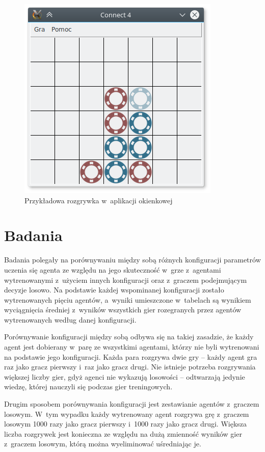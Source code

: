 \documentclass[a4paper, 12pt, oneside]{report}
\begin{document}
\begin{figure}[ht]
\centering
\includegraphics[scale=0.8]{connect4_gui.png}
\caption{Przykładowa rozgrywka w~aplikacji okienkowej}
\label{fig:gui}
\end{figure}

\chapter{Badania}
\label{chap:badania}

Badania polegały na porównywaniu między sobą różnych konfiguracji parametrów uczenia się agenta ze względu na jego skuteczność w~grze z~agentami wytrenowanymi z~użyciem innych konfiguracji oraz z~graczem podejmującym decyzje losowo. Na podstawie każdej wspominanej konfiguracji zostało wytrenowanych pięciu agentów, a~wyniki umieszczone w~tabelach są wynikiem wyciągnięcia średniej z~wyników wszystkich gier rozegranych przez agentów wytrenowanych według danej konfiguracji.

Porównywanie konfiguracji między sobą odbywa się na takiej zasadzie, że każdy agent jest dobierany w~parę ze wszystkimi agentami, którzy nie byli wytrenowani na podstawie jego konfiguracji. Każda para rozgrywa dwie gry -- każdy agent gra raz jako gracz pierwszy i~raz jako gracz drugi. Nie istnieje potrzeba rozgrywania większej liczby gier, gdyż agenci nie wykazują losowości -- odtwarzają jedynie wiedzę, której nauczyli się podczas gier treningowych.

Drugim sposobem porównywania konfiguracji jest zestawianie agentów z~graczem losowym. W~tym wypadku każdy wytrenowany agent rozgrywa grę z~graczem losowym 1000 razy jako gracz pierwszy i~1000 razy jako gracz drugi. Większa liczba rozgrywek jest konieczna ze względu na dużą zmienność wyników gier z~graczem losowym, którą można wyeliminować uśredniając je.
\end{document}
